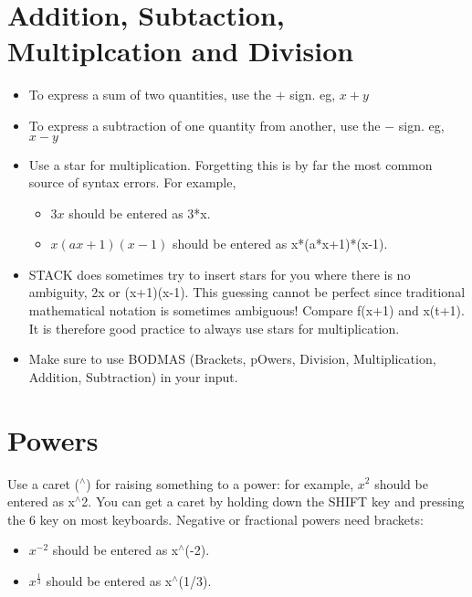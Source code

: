\documentclass[a4paper]{article}
\begin{document}
\begin{multicols}{2}
\section*{Addition, Subtaction, Multiplcation and Division}
\begin{itemize}
\item To express a sum of two quantities, use the $+$ sign. eg, $x+y$
\item To express a subtraction of one quantity from another, use the $-$ sign. eg, $x-y$
\item Use a star for multiplication. Forgetting this is by far the most common source of syntax errors. For example,
\begin{itemize}
\item $3x$ should be entered as 3*x.
\item $x(ax+1)(x-1)$ should be entered as x*(a*x+1)*(x-1).
\end{itemize}
\item STACK does sometimes try to insert stars for you where there is no ambiguity, 2x or (x+1)(x-1). This guessing cannot be perfect since traditional mathematical notation is sometimes ambiguous! Compare f(x+1) and x(t+1). It is therefore good practice to always use stars for multiplication.
\item Make sure to use BODMAS (Brackets, pOwers, Division, Multiplication, Addition, Subtraction) in your input.
\end{itemize}

\section*{Powers}
Use a caret ($^{\wedge}$) for raising something to a power: for example, $x^2$ should be entered as x$^{\wedge}$2. You can get a caret by holding down the SHIFT key and pressing the 6 key on most keyboards. Negative or fractional powers need brackets:
\begin{itemize}
\item $x^{-2}$ should be entered as x$^{\wedge}$(-2).
\item $x^{\frac{1}{3}}$ should be entered as x$^{\wedge}$(1/3).
\end{itemize}


\end{multicols}
\end{document}
